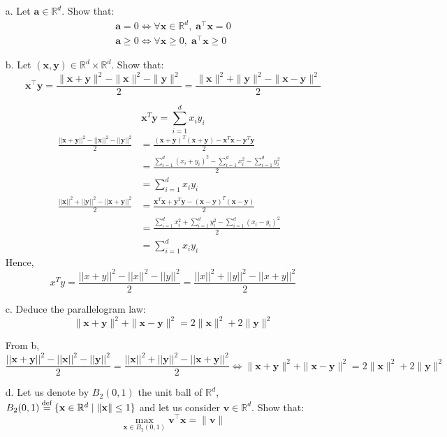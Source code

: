 \documentclass[11pt]{article}
\newcommand{\R}{\mathbb{R}}                     %
\newcommand{\bx}{\mathbf{x}}
\newcommand{\by}{\mathbf{y}}
\newcommand{\bv}{\mathbf{v}}
\newcommand{\ba}{\mathbf{a}}
\newcommand{\eqdef}{\mathbin{\stackrel{\rm def}{=}}}
\begin{document}
\begin{itemize}
    \item[a.] Let $\ba\in\R^d$. Show that:
        \begin{gather*}
            \ba = 0 \Longleftrightarrow \forall \bx\in\R^d,\;\ba^\intercal \bx = 0\\
            \ba \geq 0 \Longleftrightarrow \forall \bx\geq 0,\;\ba^\intercal \bx \geq 0
        \end{gather*}
        
\color{blue}
\color{black}

    \item[b.] Let $(\bx, \by)\in\R^d\times\R^d$. Show that:
        \begin{displaymath}
            \bx^\intercal \by = \frac{\|\bx+\by\|^2 - \|\bx\|^2-\|\by\|^2}{2}
            = \frac{\|\bx\|^2 + \|\by\|^2 - \|\bx-\by\|^2}{2}
        \end{displaymath}
        
\color{blue}
$$\bx^T\by=\sum_{i=1}^d x_iy_i$$
\begin{align*}
\frac{||\bx+\by||^2-||\bx||^2-||\by||^2}{2} &= \frac{(\bx+\by)^T(\bx+\by)-\bx^T\bx-\by^T\by}{2} &\\
&= \frac{\sum_{i=1}^d(x_i+y_i)^2-\sum_{i=1}^dx_i^2-\sum_{i=1}^dy_i^2}{2} &\\
&= \sum_{i=1}^d x_iy_i
\end{align*}
\begin{align*}
\frac{||\bx||^2+||\by||^2-||\bx+\by||^2}{2} &= \frac{\bx^T\bx+\by^T\by-(\bx-\by)^T(\bx-\by)}{2} &\\
&= \frac{\sum_{i=1}^dx_i^2+\sum_{i=1}^dy_i^2-\sum_{i=1}^d(x_i-y_i)^2}{2} &\\
&= \sum_{i=1}^d x_iy_i
\end{align*}
Hence, $$x^Ty=\frac{||x+y||^2-||x||^2-||y||^2}{2}=\frac{||x||^2+||y||^2-||x+y||^2}{2}$$
\color{black}
        
    \item[c.] Deduce the parallelogram law:
        \begin{displaymath}
                \|\bx+\by\|^2 + \|\bx-\by\|^2 = 2\|\bx\|^2 + 2\|\by\|^2
        \end{displaymath}
 
\color{blue}
From b, 
$$\frac{||\bx+\by||^2-||\bx||^2-||\by||^2}{2}=\frac{||\bx||^2+||\by||^2-||\bx+\by||^2}{2} \Leftrightarrow \|\bx+\by\|^2 + \|\bx-\by\|^2 = 2\|\bx\|^2 + 2\|\by\|^2$$
\color{black}

    \item[d.] Let us denote by $B_2(0, 1)$ the unit ball of $\R^d$, $B_2(0,1)\eqdef
        \{\bx\in\R^d\;|\;\|\bx\|\leq 1\}$ and let us consider $\bv\in\R^d$. Show that:
        \begin{displaymath}
            \max_{\bx\in B_2(0,1)}\bv^\intercal \bx = \|\bv\|
        \end{displaymath}

\color{blue}
\color{black}

\end{itemize}
\end{document}
